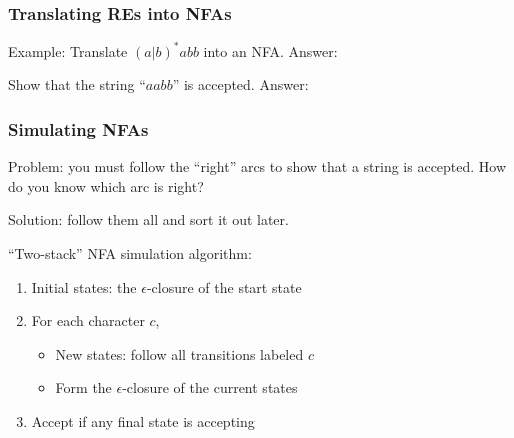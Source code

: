 \documentclass{plt}
\begin{document}
\begin{frame}[fragile]
  \frametitle{Translating REs into NFAs}

Example: Translate $(a|b)^*abb$ into an NFA. Answer:


Show that the string ``$aabb$'' is accepted. Answer:



\end{frame}

\begin{frame}
  \frametitle{Simulating NFAs}

Problem: you must follow the ``right'' arcs to show that a string is
accepted.  How do you know which arc is right?

Solution: follow them all and sort it out later.

``Two-stack'' NFA simulation algorithm:

\begin{enumerate}
\item Initial states: the $\epsilon$-closure of the start state
\item For each character $c$,
\begin{itemize}
\item New states: follow all transitions labeled $c$
\item Form the $\epsilon$-closure of the current states
\end{itemize}
\item Accept if any final state is accepting
\end{enumerate}

\end{frame}
\end{document}
